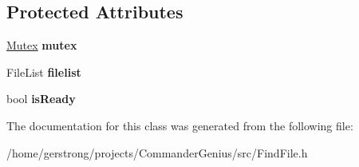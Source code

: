 \subsection*{Protected Attributes}
\begin{DoxyCompactItemize}
\item 
\hypertarget{class_file_list_cache_intf_a22965974380a061930cbe188afb2ef7b}{
\hyperlink{class_mutex}{Mutex} {\bfseries mutex}}
\label{class_file_list_cache_intf_a22965974380a061930cbe188afb2ef7b}

\item 
\hypertarget{class_file_list_cache_intf_aec8d6c0d88d81aba5d532c9d2010ee29}{
FileList {\bfseries filelist}}
\label{class_file_list_cache_intf_aec8d6c0d88d81aba5d532c9d2010ee29}

\item 
\hypertarget{class_file_list_cache_intf_aab5e5986402d329b86e9b1618c2e1fa7}{
bool {\bfseries isReady}}
\label{class_file_list_cache_intf_aab5e5986402d329b86e9b1618c2e1fa7}

\end{DoxyCompactItemize}


The documentation for this class was generated from the following file:\begin{DoxyCompactItemize}
\item 
/home/gerstrong/projects/CommanderGenius/src/FindFile.h\end{DoxyCompactItemize}
